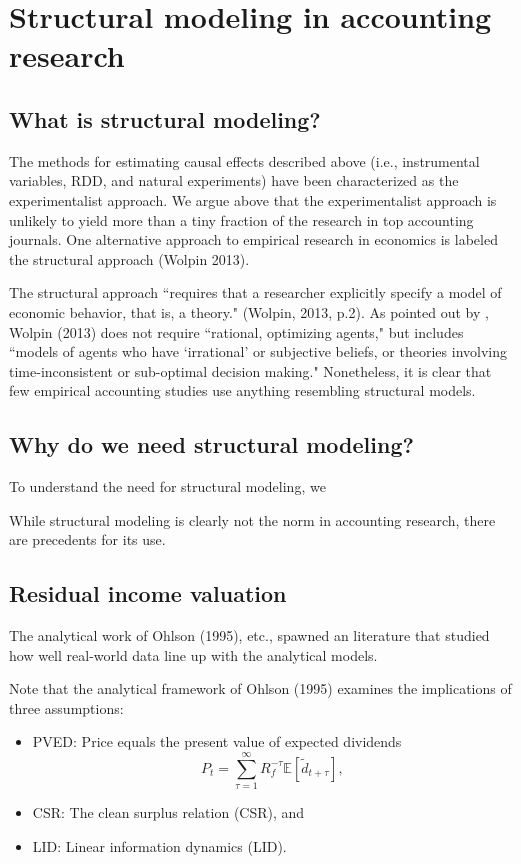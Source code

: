 

\section{Structural modeling in accounting research}

\subsection{What is structural modeling?}
The methods for estimating causal effects described above (i.e., instrumental variables, RDD, and natural experiments) have been characterized as the experimentalist approach. 
We argue above that the experimentalist approach is unlikely to yield more than a tiny fraction of the research in top accounting journals. One alternative approach to empirical research in economics is labeled the structural approach (Wolpin 2013).

The structural approach ``requires that a researcher explicitly specify a model of economic behavior, that is, a theory." (Wolpin, 2013, p.2). As pointed out by \citet{Rust:2014im}, Wolpin (2013) does not require ``rational, optimizing agents," but includes ``models of agents who have `irrational' or subjective beliefs, or theories involving time-inconsistent or sub-optimal decision making." Nonetheless, it is clear that few empirical accounting studies use anything resembling structural models.

\subsection{Why do we need structural modeling?}
To understand the need for structural modeling, we 



While structural modeling is clearly not the norm in accounting research, there are precedents for its use.

\subsection{Residual income valuation}
The analytical work of Ohlson (1995), etc., spawned an literature that studied how well real-world data line up with the analytical models.

Note that the analytical framework of Ohlson (1995) examines the implications of three assumptions: 
\begin{itemize}
\item PVED: Price equals the present value of expected dividends
\[ P_t = \sum_{\tau=1}^{\infty} R_f^{-\tau} \mathbb{E} [\tilde{d}_{t+\tau} ], \]
\item CSR: The clean surplus relation (CSR), and
\item LID: Linear information dynamics (LID). 
\end{itemize}

